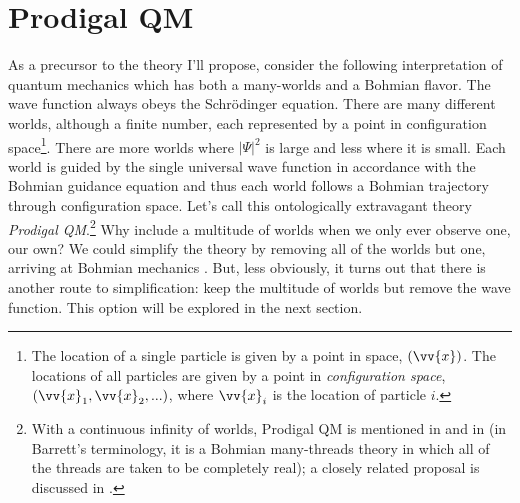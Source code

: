 \documentclass[12pt,secnumarabic,balancelastpage,amsmath,amssymb,nofootinbib]{article}
\begin{document}
\section{Prodigal QM}

As a precursor to the theory I'll propose, consider the following interpretation of quantum mechanics which has both a many-worlds and a Bohmian flavor.  The wave function always obeys the Schr\"{o}dinger equation.  There are many different worlds, although a finite number, each represented by a point in configuration space\footnote{The location of a single particle is given by a point in space, $(\vv{x})$.  The locations of all particles are given by a point in \emph{configuration space}, $(\vv{x}_1,\vv{x}_2,...)$, where $\vv{x}_i$ is the location of particle $i$.}.  There are more worlds where $|\Psi|^2$ is large and less where it is small.  Each world is guided by the single universal wave function in accordance with the Bohmian guidance equation and thus each world follows a Bohmian trajectory through configuration space.  Let's call this ontologically extravagant theory \emph{Prodigal QM}.\footnote{With a continuous infinity of worlds, Prodigal QM is mentioned in \citet[][]{valentini2010} and in \citet{barrett1999} (in Barrett's terminology, it is a Bohmian many-threads theory in which all of the threads are taken to be completely real); a closely related proposal is discussed in \citet{dorr2009}.}  Why include a multitude of worlds when we only ever observe one, our own?  We could simplify the theory by removing all of the worlds but one, arriving at Bohmian mechanics \citep[][]{valentini2010}.  But, less obviously, it turns out that there is another route to simplification: keep the multitude of worlds but remove the wave function.  This option will be explored in the next section.
\end{document}
